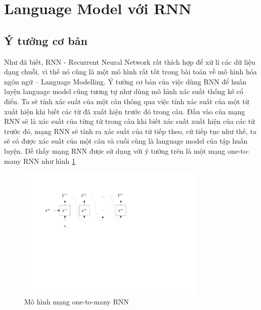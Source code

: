 \section{Language Model với RNN}
\subsection{Ý tưởng cơ bản}
Như đã biết, RNN - Recurrent Neural Network rất thích hợp để xử lí các dữ liệu dạng chuỗi, vì thế nó cũng là một mô hình rất tốt trong bài toán về mô hình hóa ngôn ngữ – Language Modelling. Ý tưởng cơ bản của việc dùng RNN để huấn luyện language model cũng tương tự như dùng mô hình xác suất thống kê cổ điển. Ta sẽ tính xác suất của một câu thông qua việc tính xác suất của một từ xuất hiện khi biết các từ đã xuất hiện trước đó trong câu. Đầu vào của mạng RNN sẽ là xác suất của từng từ trong câu khi biết xác suất xuất hiện của các từ trước đó, mạng RNN sẽ tính ra xác suất của từ tiếp theo, cứ tiếp tục như thế, ta sẽ có được xác suất của một câu và cuối cùng là language model của tập huấn luyện. Dễ thấy mạng RNN được sử dụng với ý tưởng trên là một mạng one-to-many RNN như hình \ref{fig:one-to-many-rnn}

\begin{figure}[h!]
    \centering
    \includegraphics[width=9cm]{books/artificial-neural-network/chapter07/figure-sec12/one-to-many-rnn.pdf}
    \caption{Mô hình mạng one-to-many RNN}
    \label{fig:one-to-many-rnn}
\end{figure}


